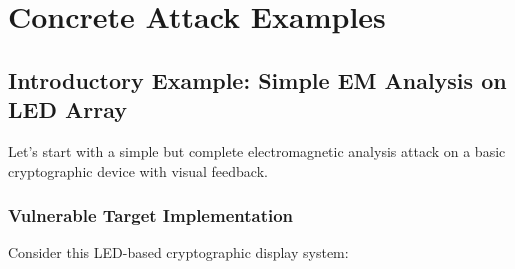 \documentclass[11pt,a4paper]{article}
\theoremstyle{definition}
\begin{document}
\section{Concrete Attack Examples}

\subsection{Introductory Example: Simple EM Analysis on LED Array}

Let's start with a simple but complete electromagnetic analysis attack on a basic cryptographic device with visual feedback.

\subsubsection{Vulnerable Target Implementation}

Consider this LED-based cryptographic display system:
\end{document}

